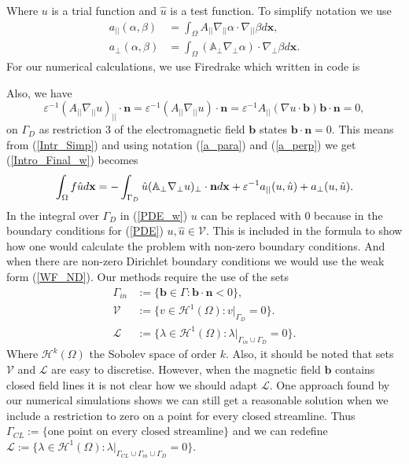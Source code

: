 \documentclass[12pt]{ociamthesis}
\begin{document}
Where $u$ is a trial function and $\hat{u}$ is a test function. To simplify notation we use
\begin{align} \label{a_para}
a_{||}(\alpha, \beta) &= \int_{\Omega} A_{||} \nabla_{||}\alpha \cdot \nabla_{||}\beta d\mathbf{x}, \\ \label{a_perp}
a_{\perp}(\alpha, \beta) &= \int_{\Omega}(\mathbb{A}_{\perp} \nabla_{\perp}\alpha )\cdot \nabla_{\perp} \beta d\mathbf{x}.
\end{align}
For our numerical calculations, we use Firedrake \cite{Dragon} which written in code is 

Also, we have 
\begin{equation} \label{Intr_Simp}
\varepsilon^{-1} (A_{||}\nabla_{||}u)_{||}\cdot \mathbf{n} = \varepsilon^{-1} (A_{||}\nabla_{||}u)\cdot \mathbf{n} = \varepsilon^{-1} A_{||}(\nabla u \cdot \mathbf{b}) \mathbf{b} \cdot \mathbf{n} = 0,
\end{equation}
on $\Gamma_D$ as restriction $3$ of the electromagnetic field $\mathbf{b}$ states $\mathbf{b}\cdot \mathbf{n}=0$. This means from (\ref{Intr_Simp}) and using notation (\ref{a_para}) and (\ref{a_perp}) we get (\ref{Intro_Final_w}) becomes
\begin{equation} \label{PDE_w}
\int_{\Omega}f\hat{u}d\mathbf{x} = -\int_{\Gamma_D}\hat{u}(\mathbb{A}_{\perp}\nabla_{\perp} u)_{\perp}\cdot \mathbf{n} d \mathbf{x} + 
\varepsilon^{-1} a_{||}(u,\hat{u})+a_{\perp}(u, \hat{u}).\\
\end{equation}
In the integral over $\Gamma_D$ in (\ref{PDE_w}) $u$ can be replaced with $0$ because in the boundary conditions for (\ref{PDE}) $u,\hat{u} \in \mathcal{V}$. This is included in the formula to show how one would calculate the problem with non-zero boundary conditions. And when there are non-zero Dirichlet boundary conditions we would use the weak form (\ref{WF_ND}).
Our methods require the use of the sets 
\begin{align}
\Gamma_{in} &:= \{\mathbf{b} \in \Gamma : \mathbf{b} \cdot \mathbf{n} < 0\}, \\
\mathcal{V} &:= \{v \in \mathcal{H}^1(\Omega) : v|_{\Gamma_{D}} = 0\}. \\
\mathcal{L} &:= \{\lambda \in \mathcal{H}^1(\Omega) : \lambda |_{\Gamma_{in}\cup \Gamma_{D}} = 0\}.
\end{align}
Where $\mathcal{H}^k(\Omega)$ the Sobolev space of order $k$. Also, it should be noted that sets $\mathcal{V}$ and $\mathcal{L}$ are easy to discretise. However, when the magnetic field $\mathbf{b}$ contains closed field lines it is not clear how we should adapt $\mathcal{L}$. One approach found by our numerical simulations shows we can still get a reasonable solution when we include a restriction to zero on a point for every closed streamline. Thus $\Gamma_{CL} := \{\text{one point on every closed streamline}\}$ and we can redefine $\mathcal{L} := \{\lambda \in \mathcal{H}^1(\Omega) : \lambda |_{\Gamma_{CL}\cup \Gamma_{in}\cup \Gamma_{D}} = 0\}$.
\end{document}
